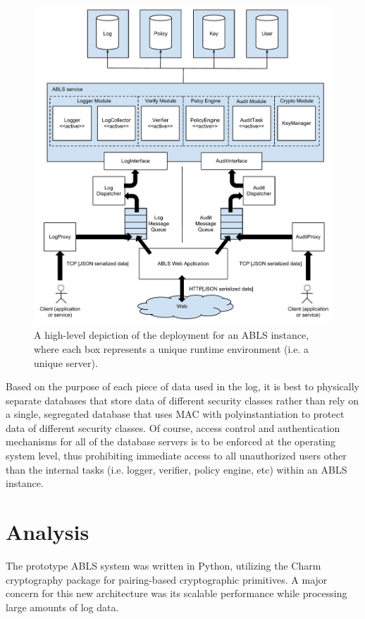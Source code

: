 \documentclass{sig-alternate}
\begin{document}
\begin{figure}[htb!]
\begin{center}
\includegraphics[width=5in]{images/deployment.pdf}
\caption{A high-level depiction of the deployment for an ABLS instance, where each box represents a unique runtime environment (i.e. a unique server).}
\label{fig:deployment}
\end{center}
\end{figure}

Based on the purpose of each piece of data used in the log, it is best to physically separate databases
that store data of different security classes rather than rely on a single, segregated database that uses MAC with 
polyinstantiation to protect data of different security classes. Of course, access control
and authentication mechanisms for all of the database servers is to be enforced at the operating system level, thus
prohibiting immediate access to all unauthorized users other than the internal tasks (i.e. logger, verifier, policy engine, etc) 
within an ABLS instance. 

\section{Analysis}
The prototype ABLS system was written in Python, utilizing the Charm cryptography package 
\cite{akinyelecharm} for pairing-based cryptographic primitives. A major concern for this new architecture 
was its scalable performance while processing large amounts of log data. 
\end{document}

